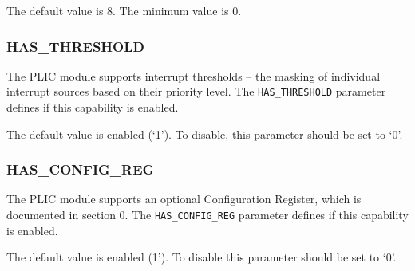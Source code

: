 The default value is 8. The minimum value is 0.

\subsubsection{HAS\_THRESHOLD}

The PLIC module supports interrupt thresholds -- the masking of
individual interrupt sources based on their priority level. The
\texttt{HAS\_THRESHOLD} parameter defines if this capability is enabled.

The default value is enabled (`1'). To disable, this parameter should be
set to `0'.

\subsubsection{HAS\_CONFIG\_REG}

The PLIC module supports an optional Configuration Register, which is
documented in section 0. The \texttt{HAS\_CONFIG\_REG} parameter defines
if this capability is enabled.

The default value is enabled (1'). To disable this parameter should be
set to `0'.
